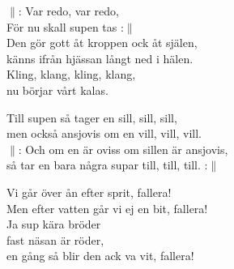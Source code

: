 \documentclass[a6paper,10pt]{article}
\begin{document}
\setlength{\oddsidemargin}{-0.37in}
\noindent
\begin{center}
\end{center}
\begin{lyrics}
$\|$: Var redo, var redo, \\
För nu skall supen tas :$\|$\\
Den gör gott åt kroppen ock åt själen, \\
känns ifrån hjässan långt ned i hälen. \\
Kling, klang, kling, klang, \\
nu börjar vårt kalas. 
\end{lyrics}
\vspace{20pt}
\begin{center}
\end{center}
\begin{lyrics}
Till supen så tager en sill, sill, sill, \\
men också ansjovis om en vill, vill, vill. \\
$\|$: Och om en är oviss om sillen är ansjovis, \\
så tar en bara några supar till, till, till. :$\|$
\end{lyrics}
\vspace{20pt}
\begin{center}
\end{center}
\begin{lyrics}
Vi går över ån efter sprit, fallera!\\
Men efter vatten går vi ej en bit, fallera!\\
Ja sup kära bröder\\
fast näsan är röder,\\
en gång så blir den ack va vit, fallera!
\end{lyrics}
\end{document}
